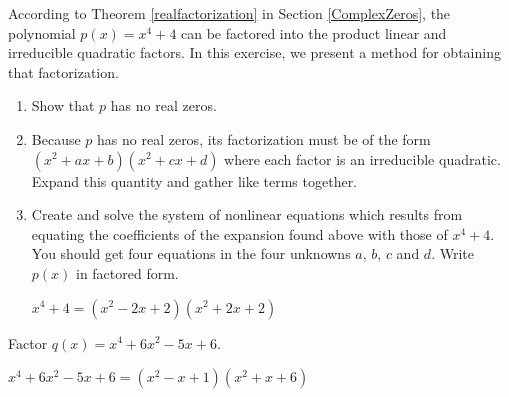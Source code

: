 \documentclass{ximera}
\begin{document}
\begin{problem}\label{factorpolywithnonlinear}
According to Theorem \ref{realfactorization} in Section \ref{ComplexZeros}, the polynomial $p(x) = x^{4} + 4$ can be factored into the product linear and irreducible quadratic factors.  In this exercise, we present a method for obtaining that factorization. 

\begin{enumerate}

\item Show that $p$ has no real zeros.  

\item Because $p$ has no real zeros, its factorization must be of the form $(x^{2} + ax + b)(x^{2} + cx + d)$ where each factor is an irreducible quadratic.  Expand this quantity and gather like terms together.

\item Create and solve the system of nonlinear equations which results from equating the coefficients of the expansion found above with those of $x^{4} + 4$.  You should get four equations in the four unknowns $a$, $b$, $c$ and $d$.  Write $p(x)$ in factored form.

\begin{solution}
    $x^{4} + 4 = (x^{2} - 2x + 2)(x^{2} + 2x + 2)$
\end{solution}

\end{enumerate}
\end{problem}
 

\begin{problem}
Factor $q(x) = x^{4} + 6x^{2} - 5x + 6$.  

\begin{solution}
    $x^{4} + 6x^{2} - 5x + 6 = (x^{2} - x + 1)(x^{2} + x + 6)$
\end{solution}
\end{problem}
\end{document}
